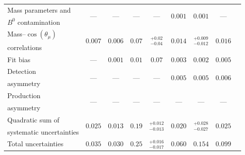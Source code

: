 \documentclass[12pt,a4paper]{article}
\def\cosTmu  {\ensuremath{\cos(\theta_{\mu})}\xspace}
\newcommand{\Bd}{\ensuremath{B^0}\xspace}
\begin{document}
\begin{table}[t!]
\begin{center}
{\begin{tabular}{lcccccccc}
Mass parameters and   & \multirow{2}{*}{---} & \multirow{2}{*}{---} & \multirow{2}{*}{---}& \multirow{2}{*}{---}& \multirow{2}{*}{$0.001$}& \multirow{2}{*}{$0.001$} & \multirow{2}{*}{---} \\
\Bd contamination     & & & & & & &  \\
Mass--\cosTmu   & \multirow{2}{*}{$	0.007	$} & \multirow{2}{*}{$	0.006$} & \multirow{2}{*}{$	0.07	$}& \multirow{2}{*}{$^{	+0.02	}_{	-0.04	}$}& \multirow{2}{*}{$	0.014$}& \multirow{2}{*}{$^{	+0.009	}_{	-0.012	}$} & \multirow{2}{*}{$	0.016	$} \\
correlations     & & & & & & &  \\
\multirow{2}{*}{Fit bias}  & \multirow{2}{*}{---} & \multirow{2}{*}{$0.001$} & \multirow{2}{*}{$0.01$}& \multirow{2}{*}{$0.07$}& \multirow{2}{*}{$0.003$}& \multirow{2}{*}{$0.002$} & \multirow{2}{*}{$0.005$} \\                    
                          & & & & & & &  \\
Detection & \multirow{2}{*}{---} & \multirow{2}{*}{---} & \multirow{2}{*}{---}& \multirow{2}{*}{---}& \multirow{2}{*}{$0.005$}& \multirow{2}{*}{$0.005$} & \multirow{2}{*}{$0.006$} \\
asymmetry & & & & & & &  \\
Production & \multirow{2}{*}{---} & \multirow{2}{*}{---} & \multirow{2}{*}{---}& \multirow{2}{*}{---}&\multirow{2}{*}{---} & \multirow{2}{*}{---} & \multirow{2}{*}{---} \\
asymmetry & & & & & & &  \\ [+0.04in]
\hline 
Quadratic sum of &   \multirow{2}{*}{$ 0.025 $} & \multirow{2}{*}{$	0.013 $} & \multirow{2}{*}{$0.19$}& \multirow{2}{*}{$^{+	0.012	}_{-	0.013	}$}& \multirow{2}{*}{$0.020$}& \multirow{2}{*}{$^{+	0.028	}_{-	0.027	}$} & \multirow{2}{*}{$ 0.025 $} \\
systematic uncertainties & & & & & & &  \\ \hline
\multirow{2}{*}{Total uncertainties} & \multirow{2}{*}{$0.035$} & \multirow{2}{*}{$0.030$} & \multirow{2}{*}{$0.25$}& \multirow{2}{*}{$^{+	0.016	}_{-	0.017	}$}& \multirow{2}{*}{$0.060$}& \multirow{2}{*}{$0.154$} & \multirow{2}{*}{$0.099$} \\  
  & & & & & & &  \\
\hline
\end{tabular}}
\label{tab:systPwave}
\end{center}
\end{table}
\end{document}
